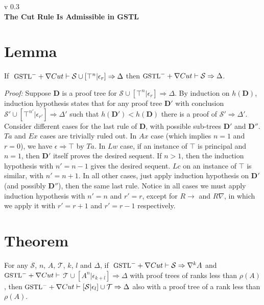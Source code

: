 \documentclass[a4paper, 12pt]{paper}
\begin{document}
{\noindent
	v 0.3 \\
{\large\textbf{The Cut Rule Is Admissible in GSTL}}
}
\\
\setcounter{section}{-1}



\section{Lemma}\label{true-assum} If $~\small\text{GSTL}^- + \nabla Cut \vdash \mathcal{S} \cup [\top^n | \epsilon_r] \Rightarrow \Delta$ then $\small\text{GSTL}^- + \nabla Cut \vdash \mathcal{S} \Rightarrow \Delta$.

\textit{Proof:} Suppose $\mathbf{D}$ is a proof tree for $\mathcal{S} \cup [\top^n | \epsilon_r] \Rightarrow \Delta$. By induction on $h(\mathbf{D})$, induction hypothesis states that for any proof tree $\mathbf{D}'$ with conclusion $\mathcal{S'} \cup [\top^{n'} | \epsilon_{r'}] \Rightarrow \Delta'$ such that $h(\mathbf{D}') < h(\mathbf{D})$ there is a proof of $\mathcal{S}' \Rightarrow \Delta'$. Consider different cases for the last rule of $\mathbf{D}$, with possible sub-trees $\mathbf{D}'$ and $\mathbf{D}''$. $Ta$ and $Ex$ cases are trivially ruled out. In $Ax$ case (which implies $n = 1$ and $r = 0$), we have $\epsilon \Rightarrow \top$ by $Ta$. In $Lw$ case, if an instance of $\top$ is principal and $n = 1$, then $\mathbf{D}'$ itself proves the desired sequent. If $n > 1$, then the induction hypothesis with $n' = n - 1$ gives the desired sequent. $Lc$ on an instance of $\top$ is similar, with $n' = n + 1$. In all other cases, just apply induction hypothesis on $\mathbf{D}'$ (and possibly $\mathbf{D}''$), then the same last rule. Notice in all cases we must apply induction hypothesis with $n' = n$ and $r' = r$, except for $R\rightarrow$ and $R\nabla$, in which we apply it with $r' = r + 1$ and $r' = r - 1$ respectively.

\section{Theorem}\label{cut-admis} For any $\mathcal{S}$, $n$, $A$, $\mathcal{T}$, $k$, $l$ and $\Delta$, if $~\small\text{GSTL}^- + \nabla Cut \vdash \mathcal{S} \Rightarrow \nabla^k A$ and $\small\text{GSTL}^- + \nabla Cut \vdash$ $\mathcal{T} \cup [A^n | \epsilon_{k+l}] \Rightarrow \Delta$ with proof trees of ranks less than $\rho(A)$, then
 $\small\text{GSTL}^- + \nabla Cut \vdash [ \mathcal{S} | \epsilon_l ] \cup \mathcal{T} \Rightarrow \Delta$ also with a proof tree of a rank less than $\rho(A)$.
 
\end{document}
